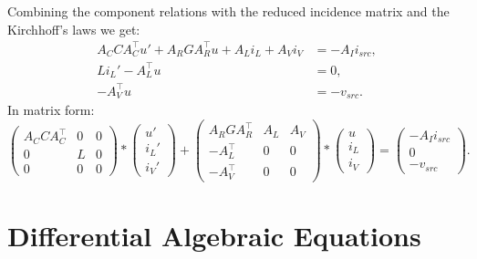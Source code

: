 	\begin{frame}
		Combining the component relations with the reduced incidence matrix and the Kirchhoff's laws we get: 
		\begin{displaymath}
			\begin{aligned}
				A_C C A_C^\top u' + A_R G A_R^\top u + A_L i_L + A_V i_V &= - A_I i_{src} , \\
				L i_L'	- A_L^\top u &= 0 , \\
				-A_V^\top u &=  -v_{src}.
			\end{aligned}	
		\end{displaymath}
		In matrix form:
		\begin{equation}
			\label{MNA_Matrixform}
			\begin{pmatrix}
				A_C C A_C^\top & 0 & 0 \\
				0 & L & 0 \\
				0 & 0 & 0
			\end{pmatrix}
			*
			\begin{pmatrix}
				u' \\
				i_L' \\
				i_V'
			\end{pmatrix}
			+
			\begin{pmatrix}
				A_R G A_R^\top & A_L & A_V \\
				-A_L^\top & 0 & 0 \\
				-A_V^\top & 0 & 0 
			\end{pmatrix}
			*
			\begin{pmatrix}
				u \\
				i_L \\
				i_V
			\end{pmatrix}
			=
			\begin{pmatrix}
				-A_I i_{src} \\
				0 \\
				-v_{src}
			\end{pmatrix} . 
		\end{equation}
	\end{frame}

\section*{Differential Algebraic Equations}
